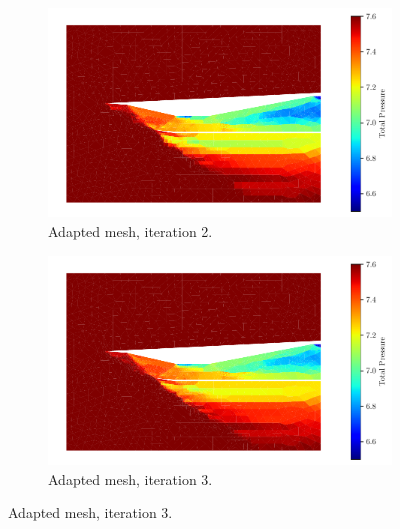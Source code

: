 \begin{figure}[h!]
    \begin{subfigure}[h]{0.49\linewidth}
        \centering
        \includegraphics[width=\linewidth]{rep/q4/Pfield2.pdf}
        \caption{Adapted mesh, iteration 2.}
    \end{subfigure}
    \begin{subfigure}[h]{0.49\linewidth}
        \centering
        \includegraphics[width=\linewidth]{rep/q4/Pfield3.pdf}
        \caption{Adapted mesh, iteration 3.}
    \end{subfigure}


\end{figure}
